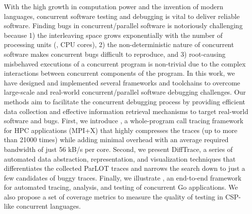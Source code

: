 
With the high growth in computation power and the invention of modern languages, concurrent software testing and debugging is vital to deliver reliable software.
%
Finding bugs in concurrent/parallel software is notoriously challenging because 1) the interleaving space grows exponentially with the number of processing units (\eg, CPU cores), 2) the non-deterministic nature of concurrent software makes concurrent bugs difficult to reproduce, and 3) root-causing misbehaved executions of a concurrent program is non-trivial due to the complex interactions between concurrent components of the program.
%
In this work, we have designed and implemented several frameworks and toolchains to overcome large-scale and real-world concurrent/parallel software debugging challenges.
%
Our methods aim to facilitate the concurrent debugging process by providing efficient data collection and effective information retrieval mechanisms to target real-world software and bugs.
%
First, we introduce \parlot, a whole-program call tracing framework for HPC applications (MPI+X) that highly compresses the traces (up to more than 21000 times) while adding minimal overhead with an average required bandwidth of just 56 kB/s per core.
%
Second, we present DiffTrace, a series of automated data abstraction, representation, and visualization techniques that differentiates the collected ParLOT traces and narrows the search down to just a few candidates of buggy traces.
%
Finally, we illustrate \goat, an end-to-end framework for automated tracing, analysis, and testing of concurrent Go applications.
%
We also propose a set of coverage metrics to measure the quality of testing in CSP-like concurrent languages.
